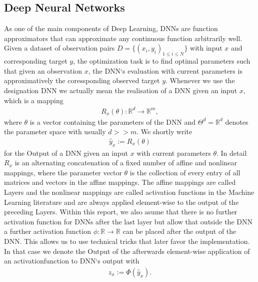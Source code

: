 \documentclass[conference]{IEEEtran}
\begin{document}
\subsection{Deep Neural Networks}
As one of the main components of Deep Learning, DNNs are function approximators that can approximate any continuous function arbitrarily well. Given a dataset of observation pairs $D =\{(x_{i}, y_{i})_{1\leq i\leq N}\}$ with input ${x}$ and corresponding target $y$, the optimization task is to find optimal parameters such that given an observation $x$, the DNN`s evaluation with current parameters is approximatively the coressponding observed target $y$.  Whenever we use the designation
DNN we actually mean the realisation of a DNN given an input $x$, which is a mapping
\begin{align}
R_{x}(\theta):\mathbb{R}^{d}\rightarrow\mathbb{R}^{m},
\end{align}
where $\theta$ is a vector containing the parameters of the DNN and $\Theta^{d}=\mathbb{R}^{d}$ denotes the parameter space with usually $d >> m$. We shortly write 
\begin{align} 
\hat{y}_{x} := R_{x}(\theta)
\end{align}
for the Output of a DNN given an input $x$ with current parameters $\theta$. In detail $R_{x}$ is an alternating concatenation of a fixed number of affine and nonlinear mappings, where the parameter vector $\theta$ is the collection of every entry of all matrices and vectors in the affine mappings. The affine mappings are called Layers and the nonlinear mappings are called activation functions in the Machine Learning literature and are always applied element-wise to the output of the preceding Layers. %
Within this report, we also asume that there is no further activation function for DNNs after the last layer but allow that outside the DNN a further activation function $\phi:\mathbb{R}\rightarrow\mathbb{R}$ can be placed after the output of the DNN. This allows us to use technical tricks that later favor the implementation.
In that case we denote the Output of the afterwards element-wise application of an activationfunction to DNN`s output with
\begin{align}
z_{x} := \Phi(\hat{y}_{x}).
\end{align}
\end{document}
